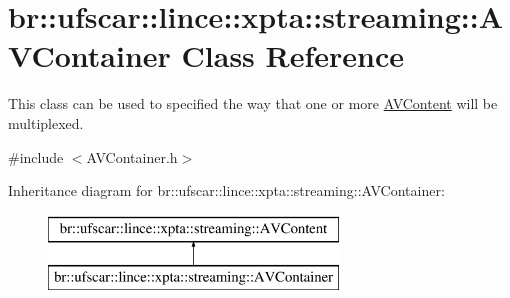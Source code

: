\hypertarget{classbr_1_1ufscar_1_1lince_1_1xpta_1_1streaming_1_1AVContainer}{
\section{br::ufscar::lince::xpta::streaming::AVContainer Class Reference}
\label{classbr_1_1ufscar_1_1lince_1_1xpta_1_1streaming_1_1AVContainer}
}


This class can be used to specified the way that one or more \hyperlink{classbr_1_1ufscar_1_1lince_1_1xpta_1_1streaming_1_1AVContent}{AVContent} will be multiplexed.  




{\ttfamily \#include $<$AVContainer.h$>$}

Inheritance diagram for br::ufscar::lince::xpta::streaming::AVContainer:\begin{figure}[H]
\begin{center}
\leavevmode
\includegraphics[height=2cm]{classbr_1_1ufscar_1_1lince_1_1xpta_1_1streaming_1_1AVContainer}
\end{center}
\end{figure}
